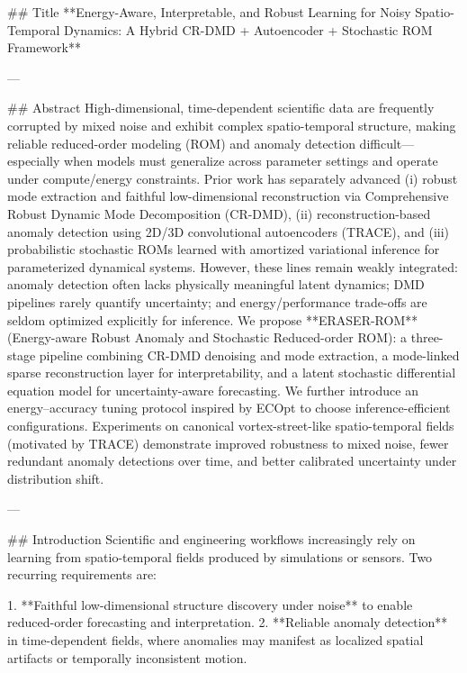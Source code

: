 ## Title  
**Energy-Aware, Interpretable, and Robust Learning for Noisy Spatio-Temporal Dynamics: A Hybrid CR-DMD + Autoencoder + Stochastic ROM Framework**

---

## Abstract  
High-dimensional, time-dependent scientific data are frequently corrupted by mixed noise and exhibit complex spatio-temporal structure, making reliable reduced-order modeling (ROM) and anomaly detection difficult—especially when models must generalize across parameter settings and operate under compute/energy constraints. Prior work has separately advanced (i) robust mode extraction and faithful low-dimensional reconstruction via Comprehensive Robust Dynamic Mode Decomposition (CR-DMD), (ii) reconstruction-based anomaly detection using 2D/3D convolutional autoencoders (TRACE), and (iii) probabilistic stochastic ROMs learned with amortized variational inference for parameterized dynamical systems. However, these lines remain weakly integrated: anomaly detection often lacks physically meaningful latent dynamics; DMD pipelines rarely quantify uncertainty; and energy/performance trade-offs are seldom optimized explicitly for inference.  
We propose **ERASER-ROM** (Energy-aware Robust Anomaly and Stochastic Reduced-order ROM): a three-stage pipeline combining CR-DMD denoising and mode extraction, a mode-linked sparse reconstruction layer for interpretability, and a latent stochastic differential equation model for uncertainty-aware forecasting. We further introduce an energy–accuracy tuning protocol inspired by ECOpt to choose inference-efficient configurations. Experiments on canonical vortex-street-like spatio-temporal fields (motivated by TRACE) demonstrate improved robustness to mixed noise, fewer redundant anomaly detections over time, and better calibrated uncertainty under distribution shift.  

---

## Introduction  
Scientific and engineering workflows increasingly rely on learning from spatio-temporal fields produced by simulations or sensors. Two recurring requirements are:

1. **Faithful low-dimensional structure discovery under noise** to enable reduced-order forecasting and interpretation.  
2. **Reliable anomaly detection** in time-dependent fields, where anomalies may manifest as localized spatial artifacts or temporally inconsistent motion.

